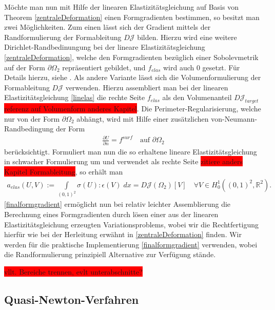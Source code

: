 \documentclass[bibliography=totoc,12pt,a4paper]{scrartcl}
\theoremstyle{exampstyle}
\numberwithin{equation}{section}
\begin{document}
Möchte man nun mit Hilfe der linearen Elastizitätsgleichung auf Basis von Theorem \ref{zentraleDeformation} einen Formgradienten bestimmen, so besitzt man zwei Möglichkeiten. Zum einen lässt sich der Gradient mittels der Randformulierung der Formableitung $D\mathcal{J}$ bilden. Hierzu wird eine weitere Dirichlet-Randbedinungung bei der lineare Elastizitätsgleichung \ref{zentraleDeformation}, welche den Formgradienten bezüglich einer Sobolevmetrik auf der Form $\partial\Omega_2$ repräsentiert gebildet, und $f_{elas}$ wird auch $0$ gesetzt. Für Details hierzu, siehe \cite{bfgs1}.
Als andere Variante lässt sich die Volumenformulierung der Formableitung $D\mathcal{J}$ verwenden. Hierzu assembliert man bei der linearen Elastizitätsgleichung \ref{linelas} die rechte Seite $f_{elas}$ als den Volumenanteil $D\mathcal{J}_{target}$ \colorbox{red}{referenz auf Volumenform anderes Kapitel}. Die Perimeter-Regularisierung, welche nur von der Form $\partial\Omega_2$ abhängt, wird mit Hilfe einer zusätzlichen von-Neumann-Randbedingung der Form
\begin{align*}
	\frac{\partial U}{\partial n} = f^{surf} \quad \text{auf } \partial\Omega_2
\end{align*}
berücksichtigt. Formuliert man nun die so erhaltene lineare Elastizitätsgleichung in schwacher Formulierung um und verwendet als rechte Seite \colorbox{red}{zitiere anders Kapitel Formableitung}, so erhält man
\begin{equation}\label{finalformgradient}
	\begin{aligned}
		a_{elas}(U,V) := \underset{(0,1)^2}{\int}\sigma(U):\epsilon(V) \;dx = D\mathcal{J}(\Omega_2)[V] \quad \forall V\in H^1_0((0,1)^2, \mathbb{R}^2).
	\end{aligned}
\end{equation}
\ref{finalformgradient} ermöglicht nun bei relativ leichter Assemblierung die Berechnung eines Formgradienten durch lösen einer aus der linearen Elastizitätsgleichung erzeugten Variationsproblems, wobei wir die Rechtfertigung hierfür wie bei der Herleitung erwähnt in \ref{zentraleDeformation} finden. Wir werden für die praktische Implementierung \ref{finalformgradient} verwenden, wobei die Randformulierung prinzipiell Alternative zur Verfügung stände. 

\colorbox{red}{vllt. Bereiche trennen, evlt unterabschnitte?}
\subsection{Quasi-Newton-Verfahren}
\end{document}
